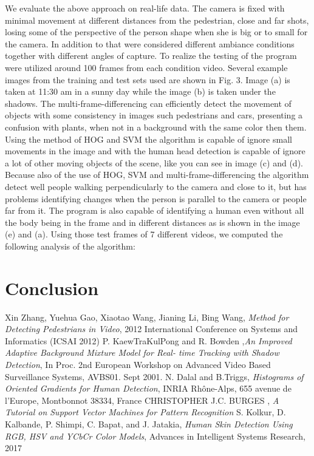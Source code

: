 \documentclass[conference]{IEEEtran}
\begin{document}
	We evaluate the above approach on real-life data. The camera is fixed with minimal movement at different distances from the pedestrian, close and far shots, losing some of the perspective of the person shape when she is big or to small for the camera. In addition to that were considered different ambiance conditions together with different angles of capture. To realize the testing of the program were utilized around 100 frames from each condition video. Several example images from the training and test sets used are shown in Fig. 3. Image (a) is taken at 11:30 am in a sunny day while the image (b) is taken under the shadows. The multi-frame-differencing can efficiently detect the movement of objects with some consistency in images such pedestrians and cars, presenting a confusion with plants, when not in a background with the same color then them. Using the method of HOG and SVM the algorithm is capable of ignore small movements in the image and with the human head detection is capable of ignore a lot of other moving objects of the scene, like you can see in image (c) and (d). Because also of the use of HOG, SVM and multi-frame-differencing the algorithm detect well people walking perpendicularly to the camera and close to it, but has problems identifying changes when the person is parallel to the camera or people far from it. The program is also capable of identifying a human even without all the body being in the frame and in different distances as is shown in the image (e) and (a). Using those test frames of 7 different videos, we computed the following analysis of the algorithm:

\section{Conclusion}

\begin{thebibliography}{00}
 Xin Zhang, Yuehua Gao, Xiaotao Wang, Jianing Li, Bing Wang, \textit{Method for Detecting Pedestrians in Video}, 2012 International Conference on Systems and Informatics (ICSAI 2012) 
 P. KaewTraKulPong and R. Bowden ,\textit{An Improved Adaptive Background Mixture Model for Real-
time Tracking with Shadow Detection}, In Proc. 2nd European Workshop on Advanced Video Based Surveillance Systems, AVBS01. Sept 2001.
 N. Dalal and B.Triggs, \textit{Histograms of Oriented Gradients for Human Detection}, INRIA Rhône-Alps, 655 avenue de l’Europe, Montbonnot 38334, France 
 CHRISTOPHER J.C. BURGES , \textit{A Tutorial on Support Vector Machines for Pattern Recognition}
 S. Kolkur, D. Kalbande, P. Shimpi, C. Bapat, and J. Jatakia, \textit{Human Skin Detection Using RGB, HSV and YCbCr Color Models}, Advances in Intelligent Systems Research, 2017
\end{thebibliography}
\vspace{12pt}
\end{document}
